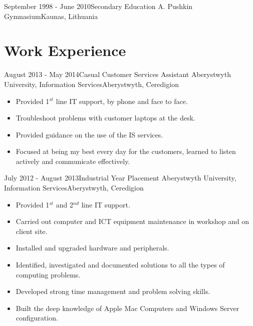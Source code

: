 \documentclass[11pt,a4paper]{moderncv}
\begin{document}
\cventry
	{September 1998 - June 2010}{Secondary Education}
	{A. Pushkin Gymnasium}{Kaunas, Lithuania}
	{}{}
		
\section{Work Experience}

\cventry
	{August 2013 - May 2014}{Casual Customer Services Assistant}
	{Aberystwyth University, Information Services}{Aberystwyth, Ceredigion}
	{}{
        \begin{itemize}
            \item Provided 1$^{st}$ line IT support, by phone and face to face.
            \item Troubleshoot problems with customer laptops at the desk.
            \item Provided guidance on the use of the IS services.
            \item Focused at being my best every day for the customers, learned to listen actively and communicate effectively.
        \end{itemize}
    }
	
\cventry
	{July 2012 - August 2013}{Industrial Year Placement}
	{Aberystwyth University, Information Services}{Aberystwyth, Ceredigion}
	{}{
        \begin{itemize}
            \item Provided 1$^{st}$ and 2$^{nd}$ line IT support.
            \item Carried out computer and ICT equipment maintenance in workshop and on client site.
            \item Installed and upgraded hardware and peripherals.
            \item Identified, investigated and documented solutions to all the types of computing problems.
            \item Developed strong time management and problem solving skills.
            \item Built the deep knowledge of Apple Mac Computers and Windows Server configuration. 
        \end{itemize}
    }
    
\end{document}
